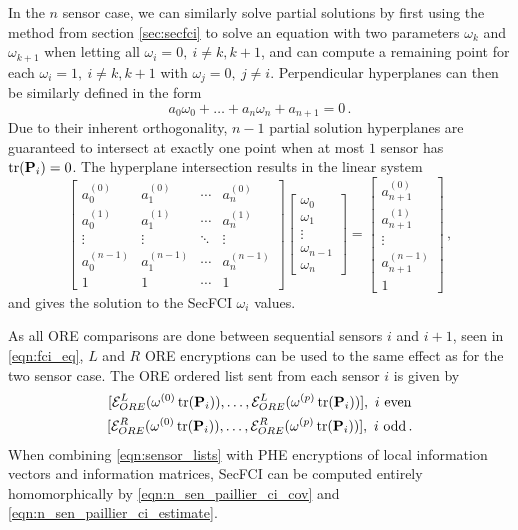 \documentclass[letterpaper, 10 pt, conference]{ieeeconf}  %
\providecommand{\DIFaddbegin}{} %
\begin{document}
In the $n$ sensor case, we can similarly solve partial solutions by first using the method from section \ref{sec:secfci} to solve an equation with two parameters $\omega_k$ and $\omega_{k+1}$ when letting all $\omega_i=0,\ i\neq k,k+1$, and can compute a remaining point for each $\omega_i=1,\ i\neq k,k+1$ with $\omega_j=0,\ j\neq i$. Perpendicular hyperplanes can then be similarly defined in the form 
\begin{equation}
   a_0\omega_0 + \dots +a_n\omega_n + a_{n+1} = 0\,. \label{eqn:nsen_plane_eq}
\end{equation}
Due to their inherent orthogonality, $n-1$ partial solution hyperplanes are guaranteed to intersect at exactly one point when at most $1$ sensor has $\operatorname{tr}({{\mathbf{P}}}_i)=0$. The hyperplane intersection results in the linear system 
\begin{equation}
   \begin{bmatrix}
      a_0^{(0)} & a_1^{(0)} & \cdots & a_n^{(0)} \\
      a_0^{(1)} & a_1^{(1)} & \cdots & a_n^{(1)} \\
      \vdots & \vdots & \ddots & \vdots \\
      a_0^{(n-1)} & a_1^{(n-1)} & \cdots & a_n^{(n-1)} \\
      1 & 1 & \cdots & 1
   \end{bmatrix}
   \begin{bmatrix}
      \omega_0 \\
      \omega_1 \\
      \vdots \\
      \omega_{n-1} \\
      \omega_n
   \end{bmatrix}
   =
   \begin{bmatrix}
      a_{n+1}^{(0)} \\
      a_{n+1}^{(1)} \\
      \vdots \\
      a_{n+1}^{(n-1)} \\
      1
   \end{bmatrix}\,, \label{eqn:hyperplane_sol_eq}
\end{equation}
and gives the solution to the SecFCI $\omega_i$ values.

As all ORE comparisons are done between sequential sensors $i$ and $i+1$, seen in \eqref{eqn:fci_eq}, $L$ and $R$ ORE encryptions can be used to the same effect as for the two sensor case. The ORE ordered list sent from each sensor $i$ is given by
\begin{equation}
   \begin{gathered} \label{eqn:sensor_lists}
      [\mathcal{E}^L_{ORE}(\omega^{(0)}\tr(\mP_i)),\dots,\mathcal{E}^L_{ORE}(\omega^{(p)}\tr(\mP_i))],\ i\text{ even} \\
      [\mathcal{E}^R_{ORE}(\omega^{(0)}\tr(\mP_i)),\dots,\mathcal{E}^R_{ORE}(\omega^{(p)}\tr(\mP_i))],\ i\text{ odd}\,.
   \end{gathered}
\end{equation}
When combining \eqref{eqn:sensor_lists} with PHE encryptions of local information vectors and information matrices, SecFCI can be computed entirely homomorphically by \eqref{eqn:n_sen_paillier_ci_cov} and \eqref{eqn:n_sen_paillier_ci_estimate}.
\DIFaddbegin 
\end{document}
